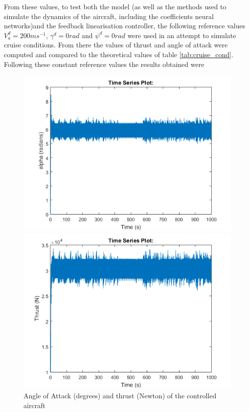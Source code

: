 From these values, to test both the model (as well as the methods used to simulate the dynamics of the aircraft, including the coefficients neural networks)and the feedback linearisation controller, the following reference values $V_a^d=200 ms^{-1}$, $\gamma^d = 0 rad$ and $\psi^d=0 rad$ were used in an attempt to simulate cruise conditions. From there the values of thrust and angle of attack were computed and  compared to the theoretical values of table \ref{tab:cruise_cond}. 
Following these constant reference values the results obtained were

\begin{figure}
\centering
\begin{minipage}{0.49\textwidth}
\includegraphics[width=\textwidth]{Figures/Results/aoa_check.PNG}
\end{minipage}
\begin{minipage}{0.49\textwidth}
\includegraphics[width=\textwidth]{Figures/Results/thrust_check.PNG}
\end{minipage}
\caption[AoA and thrust validation]{Angle of Attack (degrees) and thrust (Newton) of the controlled aircraft}
\end{figure}

